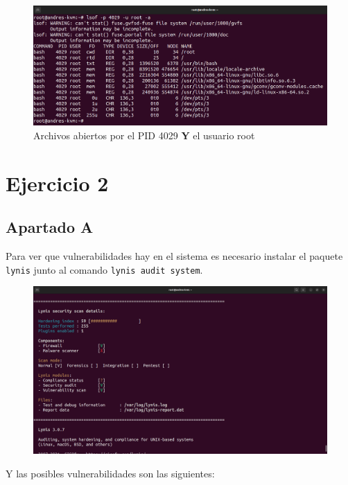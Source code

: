 \documentclass{article}
\begin{document}
\begin{figure}[H]
    \includegraphics[width=\textwidth]{imagenes/lsofand.png}
    \caption{Archivos abiertos por el PID 4029 \textbf{Y} el usuario root}
\end{figure}

\section*{Ejercicio 2}
\subsection*{Apartado A}
Para ver que vulnerabilidades hay en el sistema es necesario instalar el paquete \verb|lynis| junto al comando \verb|lynis audit system|.

\begin{figure}[H]
    \includegraphics[width=\textwidth]{imagenes/lynisresults1.png}
\end{figure}

Y las posibles vulnerabilidades son las siguientes:
\end{document}
